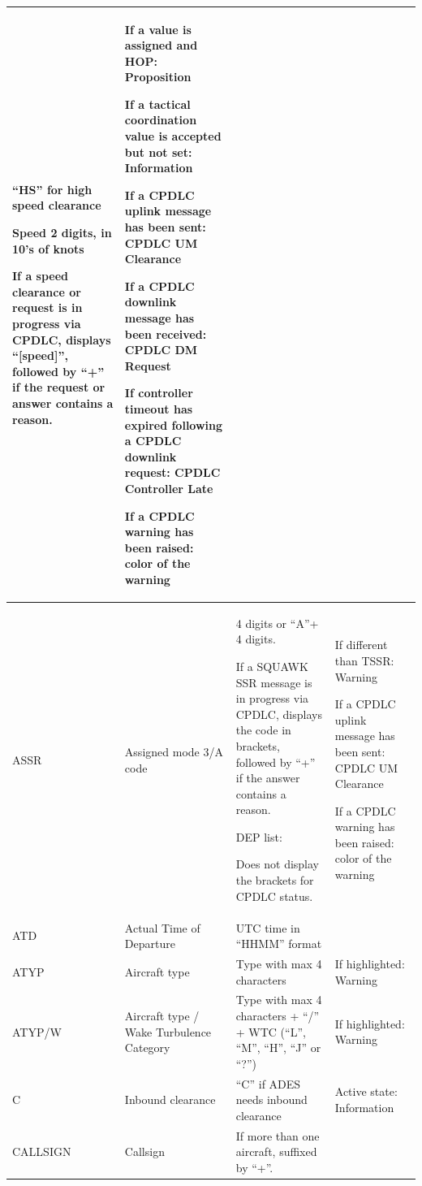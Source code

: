 \documentclass[11pt,a4paper]{memoir}
\begin{document}
\begin{longtable}{|p{2.5cm}|p{2.5cm}|p{4.5cm}|p{4.5cm}|}
      “HS” for high speed clearance 
      \bigskip

      Speed 2 digits, in 10’s of knots
      \bigskip
      
      If a speed clearance or request is in  progress via CPDLC, displays  “{[}speed{]}”, followed by “+” if the  request or answer contains a reason. &
      If a value is assigned and  HOP: Proposition 
      \smallskip

      If a tactical coordination  value is accepted but not  set: Information 
      \smallskip
      
      If a CPDLC uplink message  has been sent:  CPDLC UM Clearance 
      \smallskip
      
      If a CPDLC downlink  message has been  received:  CPDLC DM Request 
      \smallskip
      
      If controller timeout has expired following a CPDLC  downlink request:  CPDLC Controller Late 
      \smallskip
      
      If a CPDLC warning has  been raised: color of the  warning \\ \hline
    ASSR &
      Assigned mode 3/A code &
      4 digits or “A”+ 4 digits. 
      \bigskip

      If a SQUAWK SSR message is in  progress via CPDLC, displays the  code in brackets, followed by “+” if  the answer contains a reason. 
      \bigskip

      DEP list:
      
      Does not display the  brackets for CPDLC status. &
      If different than TSSR:  Warning 
      \smallskip

      If a CPDLC uplink message  has been sent:  CPDLC UM Clearance 
      \smallskip
      
      If a CPDLC warning has  been raised: color of the  warning \\ \hline
    ATD &
      Actual Time of Departure &
      UTC time in “HHMM” format &
       \\ \hline
    ATYP &
      Aircraft type &
      Type with max 4 characters &
      If highlighted: Warning \\ \hline
    ATYP/W &
      Aircraft type / Wake  Turbulence Category &
      Type with max 4 characters + “/” +  WTC (“L”, “M”, “H”, “J” or “?”) &
      If highlighted: Warning \\ \hline
    C &
      Inbound clearance &
      “C” if ADES needs inbound clearance &
      Active state: Information \\ \hline
    CALLSIGN &
      Callsign &
      If more than one aircraft, suffixed  by “+”. 
      \bigskip
      

\end{longtable}
\end{document}
